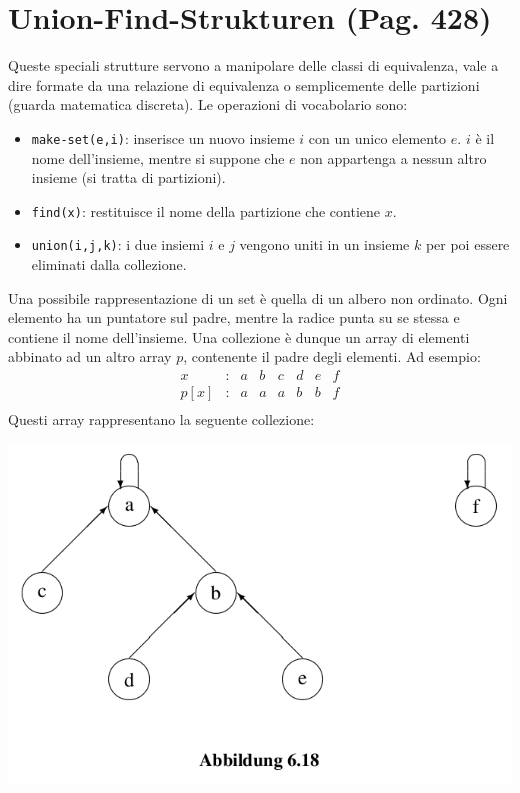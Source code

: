 \documentclass[a4paper]{book}
\newcommand{\inline}[1]{\lstinline!#1!}%
\begin{document}
\section{Union-Find-Strukturen (Pag. 428)}
Queste speciali strutture servono a manipolare delle classi di equivalenza, vale a dire formate da una relazione di equivalenza o semplicemente delle partizioni (guarda matematica discreta). Le operazioni di vocabolario sono:
\begin{itemize}
\item \inline{make-set(e,i)}: inserisce un nuovo insieme $i$ con un unico elemento $e$. $i$ è il nome dell'insieme, mentre si suppone che $e$ non appartenga a nessun altro insieme (si tratta di partizioni).
\item \inline{find(x)}: restituisce il nome della partizione che contiene $x$.
\item \inline{union(i,j,k)}: i due insiemi $i$ e $j$ vengono uniti in un insieme $k$ per poi essere eliminati dalla collezione.
\end{itemize}
Una possibile rappresentazione di un set è quella di un albero non ordinato. Ogni elemento ha un puntatore sul padre, mentre la radice punta su se stessa e contiene il nome dell'insieme. Una collezione è dunque un array di elementi abbinato ad un altro array $p$, contenente il padre degli elementi. Ad esempio:
\[\begin{array}{*{20}{c}}
{x}&{:}&a&{b}&{c}&d&e&f\\
{p[x]}&{:}&{a}&{a}&{a}&{b}&b&f\\
\end{array}\]
Questi array rappresentano la seguente collezione:
\begin{center}
\includegraphics[scale=0.4]{Figures/ufs.png}
\end{center}
\end{document}
